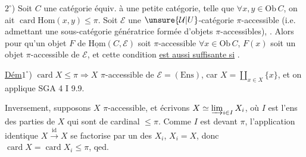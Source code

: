 $2^\circ$) Soit $C$ une catégorie équiv. à une petite catégorie, telle que $\forall x,y\in\mathrm{Ob}\,C$, on ait $\operatorname{card}\mathrm{Hom}(x,y)\leq\pi$. Soit $\mathscr E$ 
une $\unsure{\mathcal U|U}$-catégorie   $\pi$-accessible (i.e. admettant une sous-catégorie génératrice formée d'objets $\pi$-accessibles),  . Alors pour qu'un objet $F$ de $\underline{\mathrm{Hom}}(C,\mathscr E)$ soit $\pi$-accessible   $\forall x\in\mathrm{Ob}\,C$, $F(x)$ soit un objet $\pi$-accessible de $\mathscr E$, et cette condition \uline{est aussi suffisante si}  .

\uline{Dém}\quad $1^\circ$) $\operatorname{card}X\leq\pi\Rightarrow X$ $\pi$-accessible de $\mathscr E=(\mathrm{Ens})$, car $X=\coprod_{x\in X}\{x\}$, et on applique SGA 4 I 9.9.

Inversement, supposons $X$ $\pi$-accessible,  et écrivons $X\simeq\varinjlim_{i\in I}X_i$, où $I$ est l'ens des parties de $X$ qui sont de cardinal $\leq\pi$. Comme $I$ est  devant $\pi$, l'application identique $X\xrightarrow{\mathrm{id}}X$ se factorise par un des $X_i$,  $X_i=X$, donc $\operatorname{card}X=\operatorname{card}X_i\leq\pi$, qed.

